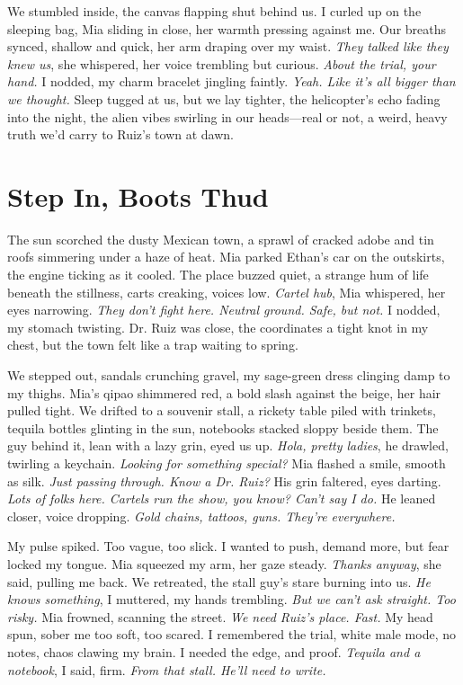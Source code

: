 \documentclass[12pt,oneside]{book}
\begin{document}
We stumbled inside, the canvas flapping shut behind us. I curled up on the sleeping bag, Mia sliding in close, her warmth pressing against me. Our breaths synced, shallow and quick, her arm draping over my waist. \textit{They talked like they knew us}, she whispered, her voice trembling but curious. \textit{About the trial, your hand.} I nodded, my charm bracelet jingling faintly. \textit{Yeah. Like it’s all bigger than we thought.} Sleep tugged at us, but we lay tighter, the helicopter’s echo fading into the night, the alien vibes swirling in our heads—real or not, a weird, heavy truth we’d carry to Ruiz’s town at dawn.

\chapter{Step In, Boots Thud}

The sun scorched the dusty Mexican town, a sprawl of cracked adobe and tin roofs simmering under a haze of heat. Mia parked Ethan’s car on the outskirts, the engine ticking as it cooled. The place buzzed quiet, a strange hum of life beneath the stillness, carts creaking, voices low. \textit{Cartel hub}, Mia whispered, her eyes narrowing. \textit{They don’t fight here. Neutral ground. Safe, but not.} I nodded, my stomach twisting. Dr. Ruiz was close, the coordinates a tight knot in my chest, but the town felt like a trap waiting to spring.

We stepped out, sandals crunching gravel, my sage-green dress clinging damp to my thighs. Mia’s qipao shimmered red, a bold slash against the beige, her hair pulled tight. We drifted to a souvenir stall, a rickety table piled with trinkets, tequila bottles glinting in the sun, notebooks stacked sloppy beside them. The guy behind it, lean with a lazy grin, eyed us up. \textit{Hola, pretty ladies}, he drawled, twirling a keychain. \textit{Looking for something special?} Mia flashed a smile, smooth as silk. \textit{Just passing through. Know a Dr. Ruiz?} His grin faltered, eyes darting. \textit{Lots of folks here. Cartels run the show, you know? Can’t say I do.} He leaned closer, voice dropping. \textit{Gold chains, tattoos, guns. They’re everywhere.}

My pulse spiked. Too vague, too slick. I wanted to push, demand more, but fear locked my tongue. Mia squeezed my arm, her gaze steady. \textit{Thanks anyway}, she said, pulling me back. We retreated, the stall guy’s stare burning into us. \textit{He knows something}, I muttered, my hands trembling. \textit{But we can’t ask straight. Too risky.} Mia frowned, scanning the street. \textit{We need Ruiz’s place. Fast.} My head spun, sober me too soft, too scared. I remembered the trial, white male mode, no notes, chaos clawing my brain. I needed the edge, and proof. \textit{Tequila and a notebook}, I said, firm. \textit{From that stall. He’ll need to write.}
\end{document}
